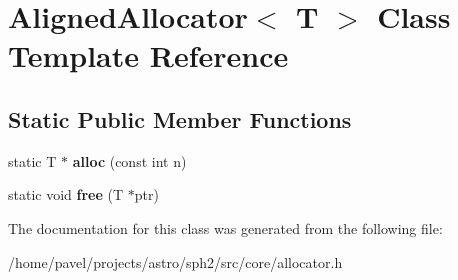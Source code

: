 \hypertarget{classAlignedAllocator}{}\section{Aligned\+Allocator$<$ T $>$ Class Template Reference}
\label{classAlignedAllocator}
\subsection*{Static Public Member Functions}
\begin{DoxyCompactItemize}
\item 
\hypertarget{classAlignedAllocator_aa4cdc547d22c3864094331c60a2b49ad}{}\label{classAlignedAllocator_aa4cdc547d22c3864094331c60a2b49ad} 
static T $\ast$ {\bfseries alloc} (const int n)
\item 
\hypertarget{classAlignedAllocator_adff4d3c25fc00f469473f387d23dcaa5}{}\label{classAlignedAllocator_adff4d3c25fc00f469473f387d23dcaa5} 
static void {\bfseries free} (T $\ast$ptr)
\end{DoxyCompactItemize}


The documentation for this class was generated from the following file\+:\begin{DoxyCompactItemize}
\item 
/home/pavel/projects/astro/sph2/src/core/allocator.\+h\end{DoxyCompactItemize}
